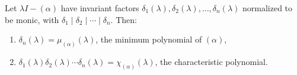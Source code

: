 Let $\lambda I - (\alpha)$ have invariant factors $\delta_1(\lambda), \delta_2(\lambda), \ldots, \delta_n(\lambda)$ normalized to be monic, with $\delta_1 \mid \delta_2 \mid \cdots \mid \delta_n$. Then:
\begin{enumerate}
\item $\delta_n(\lambda) = \mu_{(\alpha)}(\lambda)$, the minimum polynomial of $(\alpha)$,
\item $\delta_1(\lambda) \delta_2(\lambda) \cdots \delta_n(\lambda) = \chi_{(\alpha)}(\lambda)$, the characteristic polynomial.
\end{enumerate}
